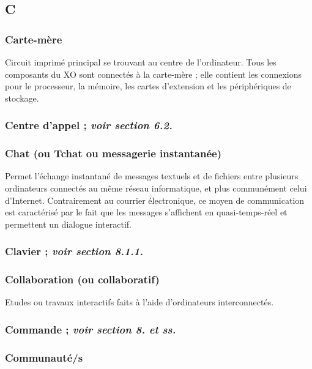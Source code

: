 \documentclass[12pt]{article}
\begin{document}
\subsection{C}
\label{sec-14-3}
\subsubsection{Carte-mère}
\label{sec-14-3-1}


Circuit imprimé principal se trouvant au centre de l'ordinateur. Tous les
composants du XO sont connectés à la carte-mère ; elle contient les
connexions pour le processeur, la mémoire, les cartes d'extension et les
périphériques de stockage.
\subsubsection{Centre d'appel ; \emph{voir section 6.2.}}
\label{sec-14-3-2}
\subsubsection{Chat (ou Tchat ou messagerie instantanée)}
\label{sec-14-3-3}


Permet l'échange instantané de messages textuels et de fichiers entre
plusieurs ordinateurs connectés au même réseau informatique, et plus
communément celui d'Internet. Contrairement au courrier électronique, ce
moyen de communication est caractérisé par le fait que les messages
s'affichent en quasi-temps-réel et permettent un dialogue interactif.
\subsubsection{Clavier ; \emph{voir section 8.1.1.}}
\label{sec-14-3-4}
\subsubsection{Collaboration (ou collaboratif)}
\label{sec-14-3-5}


Etudes ou travaux interactifs faits à l'aide d'ordinateurs interconnectés.
\subsubsection{Commande ; \emph{voir section 8. et ss.}}
\label{sec-14-3-6}
\subsubsection{Communauté/s}
\label{sec-14-3-7}
\end{document}
